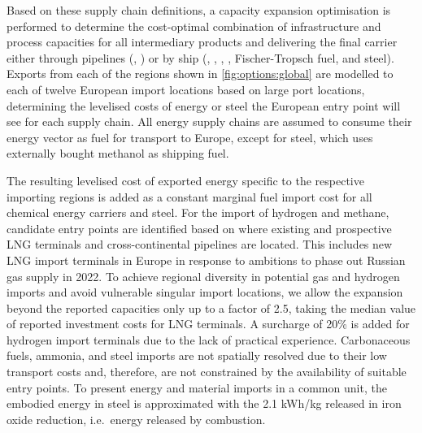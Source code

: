 
Based on these supply chain definitions, a capacity expansion optimisation is
performed to determine the cost-optimal combination of infrastructure and
process capacities for all intermediary products and delivering the final
carrier either through pipelines (, ) or by ship
(, , , , Fischer-Tropsch fuel,
and steel). Exports from each of the regions shown in \cref{fig:options:global}
are modelled to each of twelve European import locations based on large port
locations, determining the levelised costs of energy or steel the European entry
point will see for each supply chain. All energy supply chains are assumed to
consume their energy vector as fuel for transport to Europe, except for steel,
which uses externally bought methanol as shipping fuel.


The resulting levelised cost of exported energy specific to the respective
importing regions is added as a constant marginal fuel import cost for all
chemical energy carriers and steel. For the import of hydrogen and methane,
candidate entry points are identified based on where existing and prospective
LNG terminals and cross-continental pipelines are located. This includes new LNG
import terminals in Europe in response to ambitions to phase out Russian gas
supply in 2022.
\cite{instituteforenergyeconomicsandfinancialanalysisEuropeanLNG2023} To achieve
regional diversity in potential gas and hydrogen imports and avoid vulnerable
singular import locations, we allow the expansion beyond the reported capacities
only up to a factor of 2.5, taking the median value of reported investment costs
for LNG terminals.\cite{GlobalGas2022} A surcharge of 20\% is added for hydrogen
import terminals due to the lack of practical experience. Carbonaceous fuels,
ammonia, and steel imports are not spatially resolved due to their low transport
costs and, therefore, are not constrained by the availability of suitable entry
points. To present energy and material imports in a common unit, the embodied
energy in steel is approximated with the 2.1 kWh/kg released in iron oxide
reduction, i.e.~energy released by combustion.\cite{kuhnIronRecyclable2022}


